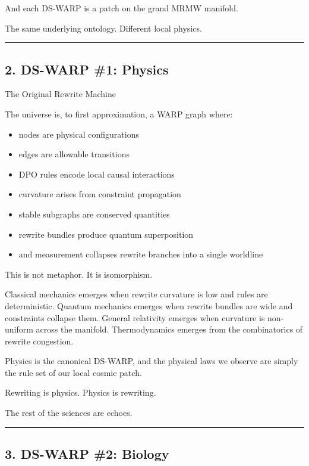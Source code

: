 And each DS-WARP is a patch on the grand MRMW manifold.

The same underlying ontology. Different local physics.

\begin{center}\rule{0.5\linewidth}{0.5pt}\end{center}

\subsection{2. DS-WARP \#1: Physics}\label{ds-rmg-1-physics}

The Original Rewrite Machine

The universe is, to first approximation, a WARP graph where:

\begin{itemize}
\tightlist
\item
  nodes are physical configurations
\item
  edges are allowable transitions
\item
  DPO rules encode local causal interactions
\item
  curvature arises from constraint propagation
\item
  stable subgraphs are conserved quantities
\item
  rewrite bundles produce quantum superposition
\item
  and measurement collapses rewrite branches into a single worldline
\end{itemize}

This is not metaphor. It is isomorphism.

Classical mechanics emerges when rewrite curvature is low and rules are
deterministic. Quantum mechanics emerges when rewrite bundles are wide
and constraints collapse them. General relativity emerges when curvature
is non-uniform across the manifold. Thermodynamics emerges from the
combinatorics of rewrite congestion.

Physics is the canonical DS-WARP, and the physical laws we observe are
simply the rule set of our local cosmic patch.

Rewriting is physics. Physics is rewriting.

The rest of the sciences are echoes.

\begin{center}\rule{0.5\linewidth}{0.5pt}\end{center}

\subsection{3. DS-WARP \#2: Biology}\label{ds-rmg-2-biology}


